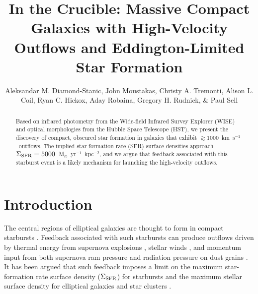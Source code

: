 \documentclass[apj]{emulateapj}
\newcommand{\kms}{km~s$^{-1}$}
\newcommand{\msun}{M$_{\odot}$}
\newcommand{\sigmasfr}{\Sigma_{\textnormal{\scriptsize{SFR}}}}
\begin{document}

\title{In the Crucible: Massive Compact Galaxies with High-Velocity
  Outflows and Eddington-Limited Star Formation}

\author{Aleksandar M. Diamond-Stanic, John
  Moustakas, Christy A. Tremonti,
  Alison L. Coil, Ryan C. Hickox, Aday
  Robaina, Gregory H. Rudnick, \& Paul
  Sell }




\begin{abstract}

Based on infrared photometry from the Wide-field Infrared Survey
Explorer (WISE) and optical morphologies from the Hubble Space
Telescope (HST), we present the discovery of compact, obscured star
formation in galaxies that exhibit $\gtrsim1000$~\kms\ outflows.  The
implied star formation rate (SFR) surface densities approach
$\sigmasfr=5000$~\msun~yr$^{-1}$~kpc$^{-2}$, and we argue that
feedback associated with this starburst event is a likely mechanism
for launching the high-velocity outflows.

\end{abstract}


\section{Introduction}

The central regions of elliptical galaxies are thought to form in
compact starbursts \citep[e.g.,][]{kor09,hop09}.  Feedback associated
with such starbursts can produce outflows driven by thermal energy
from supernova explosions \citep[e.g.,][]{che85}, stellar winds
\citep[e.g.,][]{lei92}, and momentum input from both supernova ram
pressure and radiation pressure on dust grains \citep[e.g.,][]{mur05}.
It has been argued that such feedback imposes a limit on the maximum
star-formation rate surface density ($\sigmasfr$) for starbursts
\citep[e.g.,][]{leh96,meu97,mur05,tho05} and the maximum stellar
surface density for elliptical galaxies and star clusters
\citep[e.g.,][]{hop10}.
\end{document}
